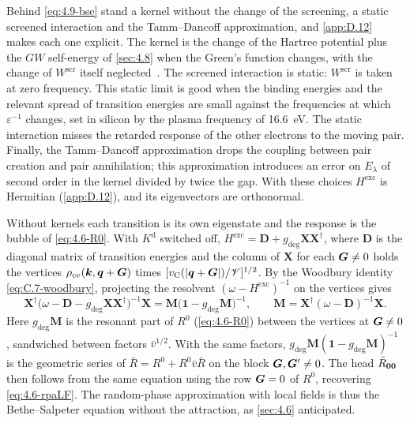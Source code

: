 Behind \cref{eq:4.9-bse} stand a kernel without the change of the screening, a static screened interaction and the Tamm--Dancoff approximation, and \cref{app:D.12} makes each one explicit. The kernel is the change of the Hartree potential plus the $GW$ self-energy of \cref{sec:4.8} when the Green's function changes, with the change of $W^{\mathrm{scr}}$ itself neglected~\cite{hanke1980many,strinati1988application}. The screened interaction is static: $W^{\mathrm{scr}}$ is taken at zero frequency. This static limit is good when the binding energies and the relevant spread of transition energies are small against the frequencies at which $\varepsilon^{-1}$ changes, set in silicon by the plasma frequency of \SI{16.6}{eV}. The static interaction misses the retarded response of the other electrons to the moving pair. Finally, the Tamm--Dancoff approximation drops the coupling between pair creation and pair annihilation; this approximation introduces an error on $E_\lambda$ of second order in the kernel divided by twice the gap. With these choices $H^{\mathrm{exc}}$ is Hermitian (\cref{app:D.12}), and its eigenvectors are orthonormal.

Without kernels each transition is its own eigenstate and the response is the bubble of \cref{eq:4.6-R0}. With $K^{\mathrm{d}}$ switched off, $H^{\mathrm{exc}} = \mathbf{D} + g_{\mathrm{deg}}\mathbf{X}\mathbf{X}^\dagger$, where $\mathbf{D}$ is the diagonal matrix of transition energies and the column of $\mathbf{X}$ for each $\bm{G}\ne0$ holds the vertices $\rho_{cv}(\bm{k},\bm{q}+\bm{G})$ times $[v_{\mathrm{C}}(|\bm{q}+\bm{G}|)/\mathscr{V}]^{1/2}$. By the Woodbury identity \cref{eq:C.7-woodbury}, projecting the resolvent $(\omega - H^{\mathrm{exc}})^{-1}$ on the vertices gives
\begin{equation*}
  \mathbf{X}^\dagger\bigl(\omega - \mathbf{D} - g_{\mathrm{deg}}\mathbf{X}\mathbf{X}^\dagger\bigr)^{-1}\mathbf{X} = \mathbf{M}\bigl(\mathbf{1} - g_{\mathrm{deg}}\mathbf{M}\bigr)^{-1}, \qquad \mathbf{M} = \mathbf{X}^\dagger(\omega - \mathbf{D})^{-1}\mathbf{X} .
\end{equation*}
Here $g_{\mathrm{deg}}\mathbf{M}$ is the resonant part of $R^0$ (\cref{eq:4.6-R0}) between the vertices at $\bm{G} \ne 0$, sandwiched between factors $\bar v^{1/2}$. With the same factors, $g_{\mathrm{deg}}\mathbf{M}(\mathbf{1} - g_{\mathrm{deg}}\mathbf{M})^{-1}$ is the geometric series of $\bar R = R^0 + R^0\bar v\bar R$ on the block $\bm{G},\bm{G}' \ne 0$. The head $\bar R_{\bm{0}\bm{0}}$ then follows from the same equation using the row $\bm{G} = 0$ of $R^0$, recovering \cref{eq:4.6-rpaLF}. The random-phase approximation with local fields is thus the Bethe--Salpeter equation without the attraction, as \cref{sec:4.6} anticipated.

